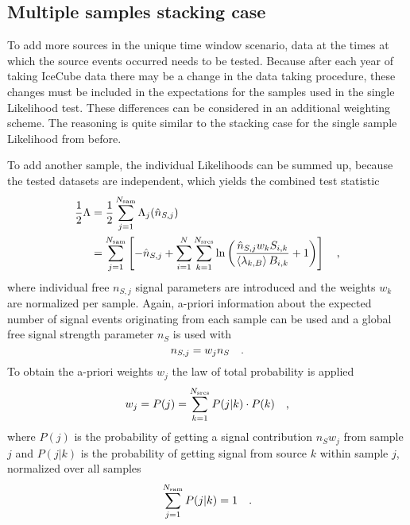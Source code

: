 
\subsection{Multiple samples stacking case}
To add more sources in the unique time window scenario, data at the times at which the source events occurred needs to be tested.
Because after each year of taking IceCube data there may be a change in the data taking procedure, these changes must be included in the expectations for the samples used in the single Likelihood test.
These differences can be considered in an additional weighting scheme.
The reasoning is quite similar to the stacking case for the single sample Likelihood from before.

To add another sample, the individual Likelihoods can be summed up, because the tested datasets are independent, which yields the combined test statistic
\begin{align}
  \frac{1}{2}\Lambda
  &= \frac{1}{2} \sum_{j=1}^{N_\text{sam}} \Lambda_j(\hat{n}_{S,j}) \\
  &= \sum_{j=1}^{N_\text{sam}} \left[ -\hat{n}_{S,j} +
    \sum_{i=1}^N \sum_{k=1}^{N_\text{srcs}} \ln\left(
      \frac{\hat{n}_{S,j} w_k S_{i,k}}{\Braket{\lambda_{k,B}} B_{i,k}}
      + 1 \right) \right]\quad\text{,} \\
\end{align}
where individual free $n_{S,j}$ signal parameters are introduced and the weights $w_k$ are normalized per sample.
Again, a-priori information about the expected number of signal events originating from each sample can be used and a global free signal strength parameter $n_S$ is used with
\begin{equation}
  n_{S,j} = w_j n_S
  \quad\text{.}
\end{equation}
To obtain the a-priori weights $w_j$ the law of total probability is applied 
\begin{equation}
  w_j = P(j) = \sum_{k=1}^{N_\text{srcs}} P(j|k)\cdot P(k)
  \quad\text{,}
\end{equation}
where $P(j)$ is the probability of getting a signal contribution $n_S w_j$ from sample $j$ and $P(j|k)$ is the probability of getting signal from source $k$ within sample $j$, normalized over all samples
\begin{equation}
  \sum_{j=1}^{N_\text{sam}} P(j|k) = 1
  \quad\text{.}
\end{equation}

